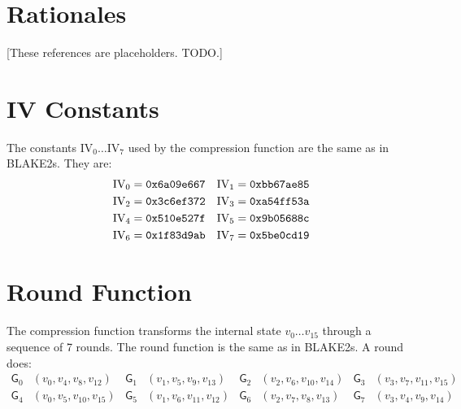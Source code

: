 \documentclass[11pt,notitlepage,a4paper]{article}
\newcommand{\GG}{\mathsf{G}}
\newcommand{\IV}{\text{IV}}
\begin{document}
\section{Rationales}\label{sec:rationales}

\nocite{*}



[These references are placeholders. TODO.]

\begin{appendices}

\section{IV Constants}\label{sec:ivconstants}

    The constants $\IV_0 \ldots \IV_7$ used by the compression function are the
    same as in BLAKE2s. They are:
\begin{align*}
    \IV_0 &= \text{\texttt{0x6a09e667}} &
    \IV_1 &= \text{\texttt{0xbb67ae85}} \\
    \IV_2 &= \text{\texttt{0x3c6ef372}} &
    \IV_3 &= \text{\texttt{0xa54ff53a}} \\
    \IV_4 &= \text{\texttt{0x510e527f}} &
    \IV_5 &= \text{\texttt{0x9b05688c}} \\
    \IV_6 &= \text{\texttt{0x1f83d9ab}} &
    \IV_7 &= \text{\texttt{0x5be0cd19}}
\end{align*}

\section{Round Function}\label{sec:roundfn}

    The compression function transforms the internal state $v_{0} \ldots
    v_{15}$ through a sequence of 7 rounds. The round function is the same as
    in BLAKE2s. A round does:
\begin{align*}
    \GG_{0}&(v_{0}, v_{4}, v_{8}, v_{12}) &
    \GG_{1}&(v_{1}, v_{5}, v_{9}, v_{13}) &
    \GG_{2}&(v_{2}, v_{6}, v_{10}, v_{14}) &
    \GG_{3}&(v_{3}, v_{7}, v_{11}, v_{15}) \\
    \GG_{4}&(v_{0}, v_{5}, v_{10}, v_{15}) &
    \GG_{5}&(v_{1}, v_{6}, v_{11}, v_{12}) &
    \GG_{6}&(v_{2}, v_{7}, v_{8}, v_{13}) &
    \GG_{7}&(v_{3}, v_{4}, v_{9}, v_{14})
\end{align*}


\end{appendices}
\end{document}
